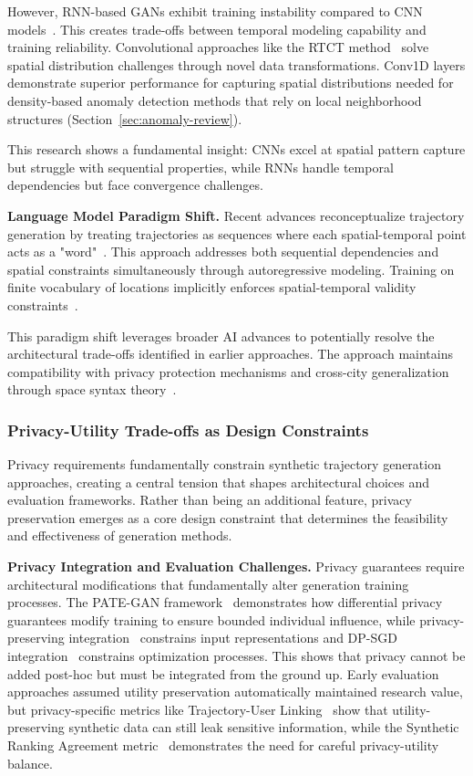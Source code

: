 \documentclass[runningheads]{llncs}
\begin{document}
However, RNN-based GANs exhibit training instability compared to CNN models~\cite{merhi2024synthetic}. This creates trade-offs between temporal modeling capability and training reliability. Convolutional approaches like the RTCT method~\cite{merhi2024synthetic} solve spatial distribution challenges through novel data transformations. Conv1D layers demonstrate superior performance for capturing spatial distributions needed for density-based anomaly detection methods that rely on local neighborhood structures (Section~\ref{sec:anomaly-review}).

This research shows a fundamental insight: CNNs excel at spatial pattern capture but struggle with sequential properties, while RNNs handle temporal dependencies but face convergence challenges.

\textbf{Language Model Paradigm Shift.} Recent advances reconceptualize trajectory generation by treating trajectories as sequences where each spatial-temporal point acts as a "word"~\cite{zhang2025end}. This approach addresses both sequential dependencies and spatial constraints simultaneously through autoregressive modeling. Training on finite vocabulary of locations implicitly enforces spatial-temporal validity constraints~\cite{kong2023mobility}.

This paradigm shift leverages broader AI advances to potentially resolve the architectural trade-offs identified in earlier approaches. The approach maintains compatibility with privacy protection mechanisms and cross-city generalization through space syntax theory~\cite{wang2025gtg}.

\subsubsection{Privacy-Utility Trade-offs as Design Constraints}

Privacy requirements fundamentally constrain synthetic trajectory generation approaches, creating a central tension that shapes architectural choices and evaluation frameworks. Rather than being an additional feature, privacy preservation emerges as a core design constraint that determines the feasibility and effectiveness of generation methods.

\textbf{Privacy Integration and Evaluation Challenges.} Privacy guarantees require architectural modifications that fundamentally alter generation training processes. The PATE-GAN framework~\cite{jordon2019pate} demonstrates how differential privacy guarantees modify training to ensure bounded individual influence, while privacy-preserving integration~\cite{rao2023cats} constrains input representations and DP-SGD integration~\cite{merhi2024synthetic} constrains optimization processes. This shows that privacy cannot be added post-hoc but must be integrated from the ground up. Early evaluation approaches assumed utility preservation automatically maintained research value, but privacy-specific metrics like Trajectory-User Linking~\cite{rao2023cats} show that utility-preserving synthetic data can still leak sensitive information, while the Synthetic Ranking Agreement metric~\cite{jordon2019pate} demonstrates the need for careful privacy-utility balance.
\end{document}
